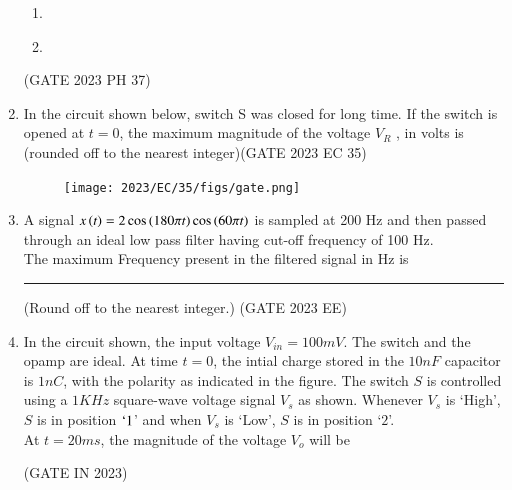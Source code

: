 \begin{enumerate}[label=\thechapter.\arabic*,ref=\thechapter.\theenumi]
\begin{enumerate}[label = (\alph*)]
    \item 
    \begin{figure}[!h]
        \centering
        \resizebox{0.2\textwidth}{!}{}
        \label{optC_gate.ph.23.37}
    \end{figure}

    \item 
    \begin{figure}[!h]
        \centering
        \resizebox{0.2\textwidth}{!}{}
        \label{optD_gate.ph.23.37}
    \end{figure}
\end{enumerate} \hfill(GATE 2023 PH 37)\\
\solution

\pagebreak

\item In the circuit shown below, switch S was closed for long time. If the switch is opened at $t=0$, the  maximum magnitude of the voltage $V_R$ , in volts is (rounded off to the nearest integer)\hfill{(GATE 2023 EC 35)}\\
\begin{figure}[h!]
    \centering
    \texttt{[image: 2023/EC/35/figs/gate.png]}
    \caption{ }
\end{figure}
\solution

\pagebreak
\item A signal $x\left(t\right)=2\cos{(180\pi t)}\cos{(60\pi t)}$ is sampled at 200 Hz and then passed through an ideal low pass filter having cut-off frequency of 100 Hz.\\
The maximum Frequency present in the filtered  signal in Hz is \rule{1cm}{0.5mm} (Round off to the nearest integer.) \hfill (GATE 2023 EE)
\solution

\pagebreak
\item In the circuit shown, the input voltage $V_{in} = 100mV$. The switch and the opamp are ideal. At time $t=0$, the intial charge stored in the $10nF$ capacitor is $1nC$, with the polarity as indicated in the figure. The switch $S$ is controlled using a $1KHz$ square-wave voltage signal $V_s$ as shown. Whenever $V_s$ is `High', $S$ is in position $`1$' and when $V_s$ is `Low', $S$ is in position `$2$'.\\
At $t = 20ms$, the magnitude of the voltage $V_o$ will be  \\  
\begin{figure}[ht]
  \centering
    \resizebox{0.55\columnwidth}{!}{}
\end{figure}
\hfill{(GATE IN 2023)}\\
\solution
\pagebreak


\end{enumerate}
